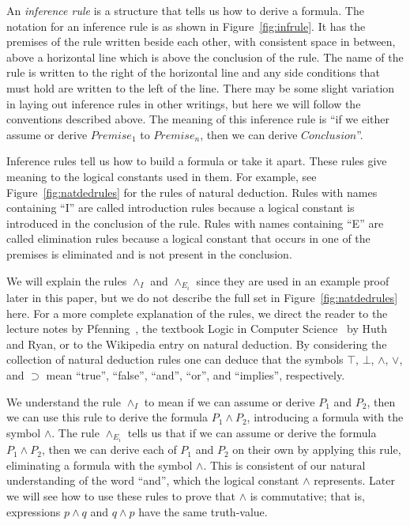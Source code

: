 \documentclass[journal]{vgtc}                %
\begin{document}
An \textit{inference rule} is a structure that tells us how to derive a formula. The notation for an inference rule is as shown in Figure~\ref{fig:infrule}. It has the premises of the rule written beside each other, with consistent space in between, above a horizontal line which is above the conclusion of the rule. The name of the rule is written to the right of the horizontal line and any side conditions that must hold are written to the left of the line. There may be some slight variation in laying out inference rules in other writings, but here we will follow the conventions described above. The meaning of this inference rule is ``if we either assume or derive $\mathit{Premise}_1$ to $\mathit{Premise}_n$, then we can derive $\mathit{Conclusion}$''.

Inference rules tell us how to build a formula or take it apart. These rules give meaning to the logical constants used in them. For example, see Figure~\ref{fig:natdedrules} for the rules of natural deduction. Rules with names containing ``I'' are called introduction rules because a logical constant is introduced in the conclusion of the rule. Rules with names containing ``E'' are called elimination rules because a logical constant that occurs in one of the premises is eliminated and is not present in the conclusion.

We will explain the rules $\wedge_I$ and $\wedge_{E_i}$ since they are used in an example proof later in this paper, but we do not describe the full set in Figure~\ref{fig:natdedrules} here. For a more complete explanation of the rules, we direct the reader to the lecture notes by Pfenning~\cite{natded-pfenning}, the textbook Logic in Computer Science~\cite{logicincs-huth+ryan} by Huth and Ryan, or to the Wikipedia entry on natural deduction. By considering the collection of natural deduction rules one can deduce that the symbols $\top$, $\bot$, $\wedge$, $\vee$, and $\supset$ mean ``true'', ``false'', ``and'', ``or'', and ``implies'', respectively.

We understand the rule $\wedge_I$ to mean if we can assume or derive $P_1$ and $P_2$, then we can use this rule to derive the formula $P_1 \wedge P_2$, introducing a formula with the symbol $\wedge$. The rule $\wedge_{E_i}$ tells us that if we can assume or derive the formula $P_1 \wedge P_2$, then we can derive each of $P_1$ and $P_2$ on their own by applying this rule, eliminating a formula with the symbol $\wedge$. This is consistent of our natural understanding of the word ``and'', which the logical constant $\wedge$ represents. Later we will see how to use these rules to prove that $\wedge$ is commutative; that is, expressions $p \wedge q$ and $q \wedge p$ have the same truth-value.
\end{document}
